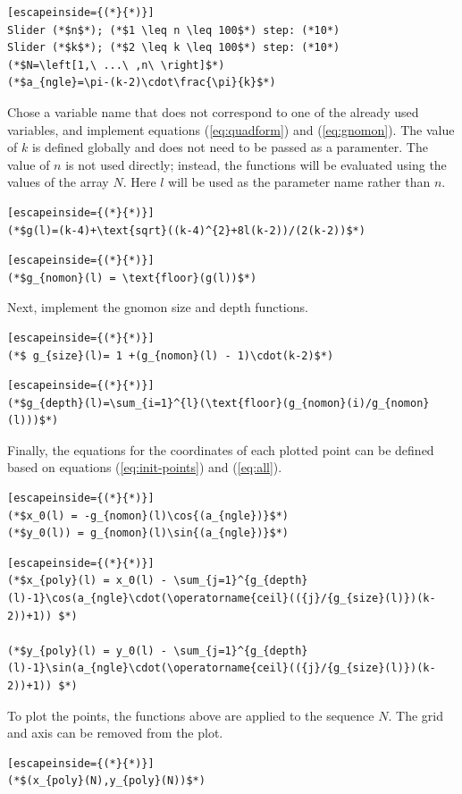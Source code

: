 \documentclass[notitlepage]{report}
\begin{document}
\begin{lstlisting}[escapeinside={(*}{*)}]
Slider (*$n$*); (*$1 \leq n \leq 100$*) step: (*10*)
Slider (*$k$*); (*$2 \leq k \leq 100$*) step: (*10*)
(*$N=\left[1,\ ...\ ,n\ \right]$*)
(*$a_{ngle}=\pi-(k-2)\cdot\frac{\pi}{k}$*)
\end{lstlisting}

Chose a variable name that does not correspond to one of the already used variables, and implement equations (\ref{eq:quadform}) and (\ref{eq:gnomon}). The value of $k$ is defined globally and does not need to be passed as a paramenter. The value of $n$ is not used directly; instead, the functions will be evaluated using the values of the array $N$. Here $l$ will be used as the parameter name rather than $n$. 

\begin{lstlisting}[escapeinside={(*}{*)}]
(*$g(l)=(k-4)+\text{sqrt}((k-4)^{2}+8l(k-2))/(2(k-2))$*)
\end{lstlisting}

\begin{lstlisting}[escapeinside={(*}{*)}]
(*$g_{nomon}(l) = \text{floor}(g(l))$*)  
\end{lstlisting}

Next, implement the gnomon size and depth functions.

\begin{lstlisting}[escapeinside={(*}{*)}]
(*$ g_{size}(l)= 1 +(g_{nomon}(l) - 1)\cdot(k-2)$*)
\end{lstlisting}

\begin{lstlisting}[escapeinside={(*}{*)}]
(*$g_{depth}(l)=\sum_{i=1}^{l}(\text{floor}(g_{nomon}(i)/g_{nomon}(l)))$*)
\end{lstlisting}

Finally, the equations for the coordinates of each plotted point can be defined based on equations (\ref{eq:init-points}) and (\ref{eq:all}).


\begin{lstlisting}[escapeinside={(*}{*)}]
(*$x_0(l) = -g_{nomon}(l)\cos{(a_{ngle})}$*)
(*$y_0(l)) = g_{nomon}(l)\sin{(a_{ngle})}$*)
\end{lstlisting}


\begin{lstlisting}[escapeinside={(*}{*)}]
(*$x_{poly}(l) = x_0(l) - \sum_{j=1}^{g_{depth}(l)-1}\cos(a_{ngle}\cdot(\operatorname{ceil}(({j}/{g_{size}(l)})(k-2))+1)) $*)

(*$y_{poly}(l) = y_0(l) - \sum_{j=1}^{g_{depth}(l)-1}\sin(a_{ngle}\cdot(\operatorname{ceil}(({j}/{g_{size}(l)})(k-2))+1)) $*)
\end{lstlisting}

To plot the points, the functions above are applied to the sequence $N$. The grid and axis can be removed from the plot.

\begin{lstlisting}[escapeinside={(*}{*)}]
(*$(x_{poly}(N),y_{poly}(N))$*)
\end{lstlisting}
\end{document}
